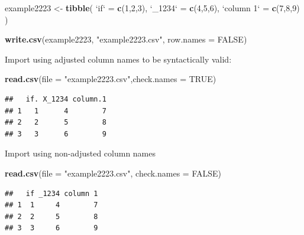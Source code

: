 \documentclass[]{book}
\newenvironment{Shaded}{\begin{snugshade}}{\end{snugshade}}
\newcommand{\DataTypeTok}[1]{\textcolor[rgb]{0.13,0.29,0.53}{#1}}
\newcommand{\DecValTok}[1]{\textcolor[rgb]{0.00,0.00,0.81}{#1}}
\newcommand{\KeywordTok}[1]{\textcolor[rgb]{0.13,0.29,0.53}{\textbf{#1}}}
\newcommand{\NormalTok}[1]{#1}
\newcommand{\OtherTok}[1]{\textcolor[rgb]{0.56,0.35,0.01}{#1}}
\newcommand{\StringTok}[1]{\textcolor[rgb]{0.31,0.60,0.02}{#1}}
\begin{document}
\begin{Shaded}
\begin{Highlighting}[]
\NormalTok{example2223 <-}\StringTok{ }\KeywordTok{tibble}\NormalTok{(}
  \StringTok{`}\DataTypeTok{if}\StringTok{`}\NormalTok{ =}\StringTok{ }\KeywordTok{c}\NormalTok{(}\DecValTok{1}\NormalTok{,}\DecValTok{2}\NormalTok{,}\DecValTok{3}\NormalTok{),}
  \StringTok{`}\DataTypeTok{_1234}\StringTok{`}\NormalTok{ =}\StringTok{ }\KeywordTok{c}\NormalTok{(}\DecValTok{4}\NormalTok{,}\DecValTok{5}\NormalTok{,}\DecValTok{6}\NormalTok{),}
  \StringTok{`}\DataTypeTok{column 1}\StringTok{`}\NormalTok{ =}\StringTok{ }\KeywordTok{c}\NormalTok{(}\DecValTok{7}\NormalTok{,}\DecValTok{8}\NormalTok{,}\DecValTok{9}\NormalTok{)}
\NormalTok{)}

\KeywordTok{write.csv}\NormalTok{(example2223, }\StringTok{"example2223.csv"}\NormalTok{, }\DataTypeTok{row.names =} \OtherTok{FALSE}\NormalTok{)}
\end{Highlighting}
\end{Shaded}

Import using adjusted column names to be syntactically valid:

\begin{Shaded}
\begin{Highlighting}[]
\KeywordTok{read.csv}\NormalTok{(}\DataTypeTok{file =} \StringTok{"example2223.csv"}\NormalTok{,}\DataTypeTok{check.names =} \OtherTok{TRUE}\NormalTok{)}
\end{Highlighting}
\end{Shaded}

\begin{verbatim}
##   if. X_1234 column.1
## 1   1      4        7
## 2   2      5        8
## 3   3      6        9
\end{verbatim}

Import using non-adjusted column names

\begin{Shaded}
\begin{Highlighting}[]
\KeywordTok{read.csv}\NormalTok{(}\DataTypeTok{file =} \StringTok{"example2223.csv"}\NormalTok{, }\DataTypeTok{check.names =} \OtherTok{FALSE}\NormalTok{)}
\end{Highlighting}
\end{Shaded}

\begin{verbatim}
##   if _1234 column 1
## 1  1     4        7
## 2  2     5        8
## 3  3     6        9
\end{verbatim}
\end{document}

